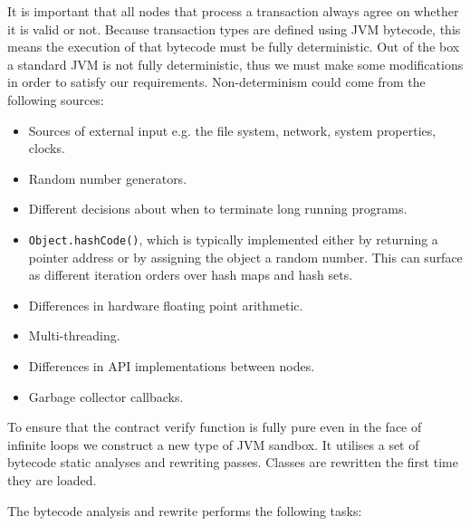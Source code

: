 \documentclass{article}
\begin{document}
It is important that all nodes that process a transaction always agree on whether it is valid or not. Because
transaction types are defined using JVM bytecode, this means the execution of that bytecode must be fully
deterministic. Out of the box a standard JVM is not fully deterministic, thus we must make some modifications in
order to satisfy our requirements. Non-determinism could come from the following sources:

\begin{itemize}
    \item Sources of external input e.g. the file system, network, system properties, clocks.
    \item Random number generators.
    \item Different decisions about when to terminate long running programs.
    \item \texttt{Object.hashCode()}, which is typically implemented either by returning a pointer address or by
    assigning the object a random number. This can surface as different iteration orders over hash maps and hash sets.
    \item Differences in hardware floating point arithmetic.
    \item Multi-threading.
    \item Differences in API implementations between nodes.
    \item Garbage collector callbacks.
\end{itemize}

To ensure that the contract verify function is fully pure even in the face of infinite loops we construct a new
type of JVM sandbox. It utilises a set of bytecode static analyses and rewriting passes.
Classes are rewritten the first time they are loaded.

The bytecode analysis and rewrite performs the following tasks:
\end{document}
